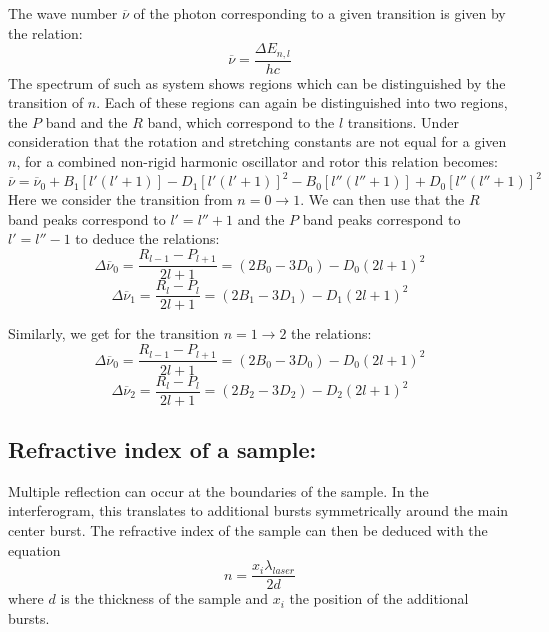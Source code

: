 \documentclass[12pt]{article}
\begin{document}
The wave number $\overline{\nu}$ of the photon corresponding to a given transition is given by the relation:
\begin{equation}
    \overline{\nu} = \frac{\Delta E_{n,l}}{h c}
\end{equation}
The spectrum of such  as system shows regions which can be distinguished by the transition of $n$. Each of these regions can again be distinguished into two regions, the $P$ band and the $R$ band, which correspond to the $l$ transitions.
Under consideration that the rotation and stretching constants are not equal for a given $n$, for a combined non-rigid harmonic oscillator and rotor this relation becomes:
\begin{equation}
    \overline{\nu} = \overline{\nu}_0 + B_1[l'(l' + 1)] - D_1[l'(l' + 1)]^2 - B_0[l''(l'' + 1)] + D_0[l''(l'' + 1)]^2
\end{equation}
Here we consider the transition from $n= 0 \rightarrow 1$. We can then use that the $R$ band peaks correspond to $l' = l'' + 1$ and the $P$ band peaks correspond to $l' = l'' - 1$ to deduce the relations:
\begin{equation}
    \Delta \overline{\nu}_0 = \frac{R_{l-1} - P_{l+1}}{2l+1} = (2 B_0 - 3 D_0) - D_0 (2l + 1 )^2
\end{equation}
\begin{equation}
    \Delta \overline{\nu}_1 = \frac{R_{l} - P_{l}}{2l+1} = (2 B_1 - 3 D_1) - D_1 (2l + 1 )^2
\end{equation}

Similarly, we get for the transition $n = 1 \rightarrow 2$ the relations:
\begin{equation}
    \Delta \overline{\nu}_0 = \frac{R_{l-1} - P_{l+1}}{2l+1} = (2 B_0 - 3 D_0) - D_0 (2l + 1 )^2
\end{equation}
\begin{equation}
    \Delta \overline{\nu}_2 = \frac{R_{l} - P_{l}}{2l+1} = (2 B_2 - 3 D_2) - D_2 (2l + 1 )^2
\end{equation} 


\subsection{Refractive index of a sample:}
Multiple reflection can occur at the boundaries of the sample. In the interferogram, this translates to additional bursts symmetrically around the main center burst. The refractive index of the sample can then be deduced with the equation
\begin{equation}
    n = \frac{x_i \lambda_{laser}}{2d}
    \label{eq:InterferogramRefractiveIndex}
\end{equation}
where $d$ is the thickness of the sample and $x_i$ the position of the additional bursts.
\end{document}
